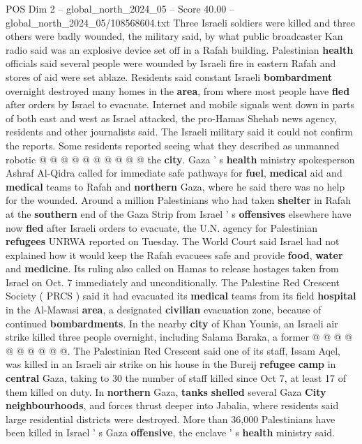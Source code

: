 \begin{textsample}{POS Dim 2 – global\_north\_2024\_05 – Score 40.00 – global\_north\_2024\_05/108568604.txt}
Three Israeli soldiers were killed and three others were badly wounded, the military said, by what public broadcaster Kan radio said was an explosive device set off in a Rafah building.
Palestinian \textbf{health} officials said several people were wounded by Israeli fire in eastern Rafah and stores of aid were set ablaze.
Residents said constant Israeli \textbf{bombardment} overnight destroyed many homes in the \textbf{area}, from where most people have \textbf{fled} after orders by Israel to evacuate.
Internet and mobile signals went down in parts of both east and west as Israel attacked, the pro-Hamas Shehab news agency, residents and other journalists said.
The Israeli military said it could not confirm the reports.
Some residents reported seeing what they described as unmanned robotic @ @ @ @ @ @ @ @ @ @ the \textbf{city}.
Gaza ' s \textbf{health} ministry spokesperson Ashraf Al-Qidra called for immediate safe pathways for \textbf{fuel}, \textbf{medical} aid and \textbf{medical} teams to Rafah and \textbf{northern} Gaza, where he said there was no help for the wounded.
Around a million Palestinians who had taken \textbf{shelter} in Rafah at the \textbf{southern} end of the Gaza Strip from Israel ' s \textbf{offensives} elsewhere have now \textbf{fled} after Israeli orders to evacuate, the U.N. agency for Palestinian \textbf{refugees} UNRWA reported on Tuesday.
The World Court said Israel had not explained how it would keep the Rafah evacuees safe and provide \textbf{food}, \textbf{water} and \textbf{medicine}.
Its ruling also called on Hamas to release hostages taken from Israel on Oct. 7 immediately and unconditionally.
The Palestine Red Crescent Society ( PRCS ) said it had evacuated its \textbf{medical} teams from its field \textbf{hospital} in the Al-Mawasi \textbf{area}, a designated \textbf{civilian} evacuation zone, because of continued \textbf{bombardments}.
In the nearby \textbf{city} of Khan Younis, an Israeli air strike killed three people overnight, including Salama Baraka, a former @ @ @ @ @ @ @ @ @ @.
The Palestinian Red Crescent said one of its staff, Issam Aqel, was killed in an Israeli air strike on his house in the Bureij \textbf{refugee} \textbf{camp} in \textbf{central} Gaza, taking to 30 the number of staff killed since Oct 7, at least 17 of them killed on duty.
In \textbf{northern} Gaza, \textbf{tanks} \textbf{shelled} several Gaza \textbf{City} \textbf{neighbourhoods}, and forces thrust deeper into Jabalia, where residents said large residential districts were destroyed.
More than 36,000 Palestinians have been killed in Israel ' s Gaza \textbf{offensive}, the enclave ' s \textbf{health} ministry said.

\end{textsample}
